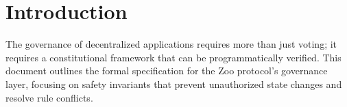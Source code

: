 \section{Introduction}
The governance of decentralized applications requires more than just voting; it requires a constitutional framework that can be programmatically verified. This document outlines the formal specification for the Zoo protocol's governance layer, focusing on safety invariants that prevent unauthorized state changes and resolve rule conflicts.
